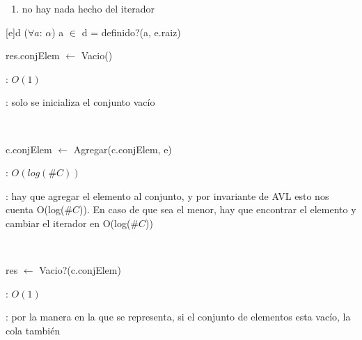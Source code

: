 \begin{Representacion}

	\begin{enumerate}

		\item no hay nada hecho del iterador

	\end{enumerate}



	{d}
	{($\forall a$: $\alpha$) a $\in$ d = definido?(a, e.raiz)}

\end{Representacion}

\begin{Algoritmos}

	\begin{algorithm}[H]
		\NoCaptionOfAlgo
		\caption{}
		res.conjElem $\leftarrow$ Vacio()
	\end{algorithm}

	\complejidad: $O(1)$

	\justifcomp: solo se inicializa el conjunto vacío

	~

	\begin{algorithm}[H]
		\NoCaptionOfAlgo
		\caption{}
		c.conjElem $\leftarrow$ Agregar(c.conjElem, e)
	\end{algorithm}

	\complejidad: $O(log(\#C))$

	\justifcomp: hay que agregar el elemento al conjunto, y por invariante de AVL esto nos cuenta O(log($\#C$)). En caso de que sea el menor, hay que encontrar el elemento y cambiar el iterador en O(log($\#C$))

	~

	\begin{algorithm}[H]
		\NoCaptionOfAlgo
		\caption{}
		res $\leftarrow$ Vacio?(c.conjElem) %
	\end{algorithm}

	\complejidad: $O(1)$

	\justifcomp: por la manera en la que se representa, si el conjunto de elementos esta vacío, la cola también


\end{Algoritmos}
